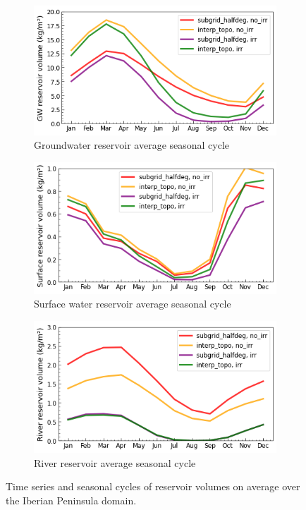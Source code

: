 \begin{figure}[htbp]
    \begin{subfigure}[b]{0.32\textwidth}
        \caption{Groundwater reservoir average seasonal cycle}
        \includegraphics[width=\linewidth]{images/chap3/time_series/slowr_seasonal_cycle.png}
    \end{subfigure}
    \begin{subfigure}[b]{0.32\textwidth}
        \caption{Surface water reservoir average seasonal cycle}
        \includegraphics[width=\linewidth]{images/chap3/time_series/fastr_seasonal_cycle.png}
    \end{subfigure}
    \begin{subfigure}[b]{0.32\textwidth}
        \caption{River reservoir average seasonal cycle}
        \includegraphics[width=\linewidth]{images/chap3/time_series/streamr_seasonal_cycle.png}
    \end{subfigure}
    \caption{Time series and seasonal cycles of reservoir volumes on average over the Iberian Peninsula domain.}
    \label{fig:reservoir_time_series}
\end{figure}

